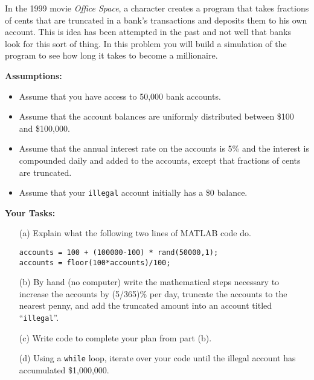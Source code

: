 \begin{problem}
    In the 1999 movie {\it Office Space}, a character creates a program that takes
    fractions of cents that are truncated in a bank's transactions and deposits them to
    his own account.  This is idea has been attempted in the past and not well that banks
    look for this sort of thing.  In this problem you will build a simulation of the
    program to see how long it takes to become a millionaire.  

    {\bf Assumptions:}
    \begin{itemize}
        \item Assume that you have access to 50,000 bank accounts.
        \item Assume that the account balances are uniformly distributed between
            \$100 and \$100,000.
        \item Assume that the annual interest rate on the accounts is 5\% and the interest
            is compounded daily and added to the accounts, except that fractions of cents
            are truncated.
        \item Assume that your \texttt{illegal} account initially has a \$0 balance.
    \end{itemize}

    {\bf Your Tasks:}
    \begin{enumerate}
        \item[(a)] Explain what the following two lines of MATLAB code do.
\begin{verbatim}
accounts = 100 + (100000-100) * rand(50000,1);
accounts = floor(100*accounts)/100;
\end{verbatim}
        \item[(b)] By hand (no computer) write the mathematical steps necessary to
            increase the accounts by (5/365)\% per day, truncate the accounts to the
            nearest penny, and add the truncated amount into an account titled
            ``\texttt{illegal}''.
        \item[(c)] Write code to complete your plan from part (b).
        \item[(d)] Using a \texttt{while} loop, iterate over your code until the illegal
            account has accumulated \$1,000,000.
    \end{enumerate}
\end{problem}


